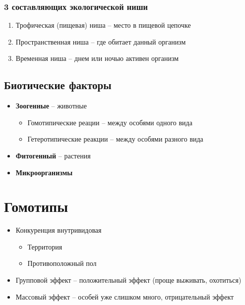 \subsubsection{3 состaвляющих экологической ниши}

\begin{enumerate}
    \item Трофическая (пищевая) ниша -- место в пищевой цепочке
    \item Пространственная ниша -- где обитает данный организм
    \item Временная ниша -- днем или ночью активен организм
\end{enumerate}

\subsection{Биотические факторы}

\begin{itemize}
    \item \textbf{Зоогенные} -- животные
        \begin{itemize}
            \item Гомотипические реации -- между особями одного вида
            \item Гетеротипические реакции -- между особями разного вида
        \end{itemize}
    \item \textbf{Фитогенный} -- растения
    \item \textbf{Микроорганизмы}
\end{itemize}

\section{Гомотипы}

\begin{itemize}
    \item Конкуренция внутривидовая

        \begin{itemize}
            \item Территория
            \item Противоположный пол
        \end{itemize}

    \item Групповой эффект --
        положительный эффект (проще выживать, охотиться)
    \item Массовый эффект
        -- особей уже слишком много, отрицательный эффект
\end{itemize}

